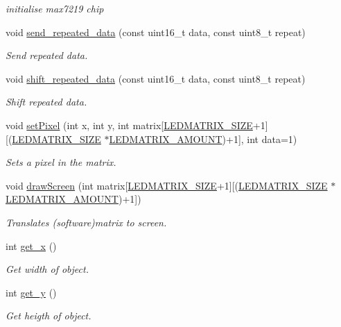 \begin{DoxyCompactItemize}
\begin{DoxyCompactList}\small\item\em initialise max7219 chip \end{DoxyCompactList}\item 
void \hyperlink{classmax7219_l_e_d_af913d07107bfc902dc66af95ead59f21}{send\+\_\+repeated\+\_\+data} (const uint16\+\_\+t data, const uint8\+\_\+t repeat)
\begin{DoxyCompactList}\small\item\em Send repeated data. \end{DoxyCompactList}\item 
void \hyperlink{classmax7219_l_e_d_ae15df95125db9c4efb33f19720c893a0}{shift\+\_\+repeated\+\_\+data} (const uint16\+\_\+t data, const uint8\+\_\+t repeat)
\begin{DoxyCompactList}\small\item\em Shift repeated data. \end{DoxyCompactList}\item 
void \hyperlink{classmax7219_l_e_d_a651b73c3236443e478785f4a3e180b3a}{set\+Pixel} (int x, int y, int matrix\mbox{[}\hyperlink{max7219_l_e_dconstants_8hpp_a2a4cf20d00f170bb1778318f645ab6cb}{L\+E\+D\+M\+A\+T\+R\+I\+X\+\_\+\+S\+I\+ZE}+1\mbox{]}\mbox{[}(\hyperlink{max7219_l_e_dconstants_8hpp_a2a4cf20d00f170bb1778318f645ab6cb}{L\+E\+D\+M\+A\+T\+R\+I\+X\+\_\+\+S\+I\+ZE} $\ast$\hyperlink{max7219_l_e_dconstants_8hpp_aa3f1c3f51823e34beb0682e7f799793b}{L\+E\+D\+M\+A\+T\+R\+I\+X\+\_\+\+A\+M\+O\+U\+NT})+1\mbox{]}, int data=1)
\begin{DoxyCompactList}\small\item\em Sets a pixel in the matrix. \end{DoxyCompactList}\item 
void \hyperlink{classmax7219_l_e_d_ace27bb3d99143c9c70cfead632e93f89}{draw\+Screen} (int matrix\mbox{[}\hyperlink{max7219_l_e_dconstants_8hpp_a2a4cf20d00f170bb1778318f645ab6cb}{L\+E\+D\+M\+A\+T\+R\+I\+X\+\_\+\+S\+I\+ZE}+1\mbox{]}\mbox{[}(\hyperlink{max7219_l_e_dconstants_8hpp_a2a4cf20d00f170bb1778318f645ab6cb}{L\+E\+D\+M\+A\+T\+R\+I\+X\+\_\+\+S\+I\+ZE} $\ast$\hyperlink{max7219_l_e_dconstants_8hpp_aa3f1c3f51823e34beb0682e7f799793b}{L\+E\+D\+M\+A\+T\+R\+I\+X\+\_\+\+A\+M\+O\+U\+NT})+1\mbox{]})
\begin{DoxyCompactList}\small\item\em Translates (software)matrix to screen. \end{DoxyCompactList}\item 
int \hyperlink{classmax7219_l_e_d_a42f5d4ddc8337981f6f32fbee145447f}{get\+\_\+x} ()
\begin{DoxyCompactList}\small\item\em Get width of object. \end{DoxyCompactList}\item 
int \hyperlink{classmax7219_l_e_d_ae3e7e73188d7abc8664b5bfca72bf4a5}{get\+\_\+y} ()
\begin{DoxyCompactList}\small\item\em Get heigth of object. \end{DoxyCompactList}\end{DoxyCompactItemize}
